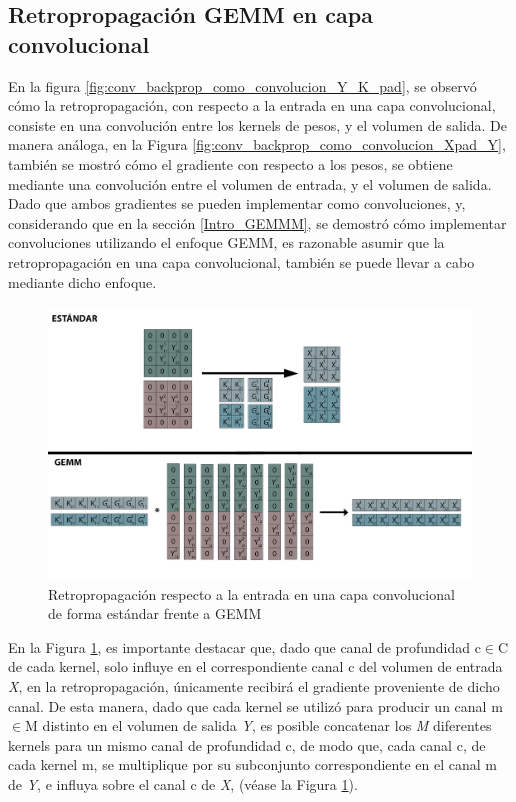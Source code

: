 \subsection{Retropropagación GEMM en capa convolucional}

En la figura \ref{fig:conv_backprop_como_convolucion_Y_K_pad}, se observó cómo la retropropagación, con respecto a la entrada en una capa convolucional, consiste en una convolución entre los kernels de pesos, y el volumen de salida. De manera análoga, en la Figura \ref{fig:conv_backprop_como_convolucion_Xpad_Y}, también se mostró cómo el gradiente con respecto a los pesos, se obtiene mediante una convolución entre el volumen de entrada, y el volumen de salida. \\
Dado que ambos gradientes se pueden implementar como convoluciones, y, considerando que en la sección \ref{Intro_GEMMM}, se demostró cómo implementar convoluciones utilizando el enfoque GEMM, es razonable asumir que la retropropagación en una capa convolucional, también se puede llevar a cabo mediante dicho enfoque.

\begin{figure}[H]
	\hspace{-40mm}
	\includegraphics[scale=0.3]{imagenes/conv_std_vs_gemm_backprop.jpg}  
	\caption{Retropropagación respecto a la entrada en una capa convolucional de forma estándar frente a GEMM}
	\label{fig:conv_std_vs_gemm_backprop}
\end{figure}

En la Figura \ref{fig:conv_std_vs_gemm_backprop}, es importante destacar que, dado que canal de profundidad c$\in$C de cada kernel, solo influye en el correspondiente canal c del volumen de entrada \textit{X}, en la retropropagación, únicamente recibirá el gradiente proveniente de dicho canal. De esta manera, dado que cada kernel se utilizó para producir un canal m$\in$M distinto en el volumen de salida \textit{Y}, es posible concatenar los \textit{M} diferentes kernels para un mismo canal de profundidad c, de modo que, cada canal c, de cada kernel m, se multiplique por su subconjunto correspondiente en el canal m de \textit{Y}, e influya sobre el canal c de \textit{X}, (véase la Figura \ref{fig:conv_std_vs_gemm_backprop}). 

